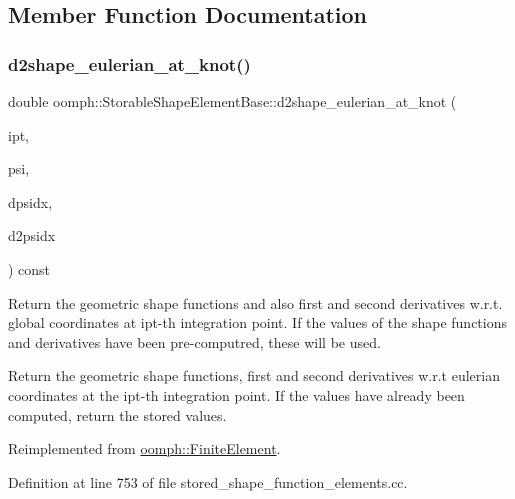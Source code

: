 \subsection{Member Function Documentation}
\mbox{\label{classoomph_1_1StorableShapeElementBase_aa8d876cca1917be4181a914ef4595c21}} 
\subsubsection{\texorpdfstring{d2shape\+\_\+eulerian\+\_\+at\+\_\+knot()}{d2shape\_eulerian\_at\_knot()}}
{\footnotesize\ttfamily double oomph\+::\+Storable\+Shape\+Element\+Base\+::d2shape\+\_\+eulerian\+\_\+at\+\_\+knot (\begin{DoxyParamCaption}\item[{const unsigned \&}]{ipt,  }\item[{\hyperlink{classoomph_1_1Shape}{Shape} \&}]{psi,  }\item[{\hyperlink{classoomph_1_1DShape}{D\+Shape} \&}]{dpsidx,  }\item[{\hyperlink{classoomph_1_1DShape}{D\+Shape} \&}]{d2psidx }\end{DoxyParamCaption}) const\hspace{0.3cm}{\ttfamily [virtual]}}



Return the geometric shape functions and also first and second derivatives w.\+r.\+t. global coordinates at ipt-\/th integration point. If the values of the shape functions and derivatives have been pre-\/computred, these will be used. 

Return the geometric shape functions, first and second derivatives w.\+r.\+t eulerian coordinates at the ipt-\/th integration point. If the values have already been computed, return the stored values. 

Reimplemented from \hyperlink{classoomph_1_1FiniteElement_aee4c4dc82cab5662c3552f86422c8b3f}{oomph\+::\+Finite\+Element}.



Definition at line 753 of file stored\+\_\+shape\+\_\+function\+\_\+elements.\+cc.



